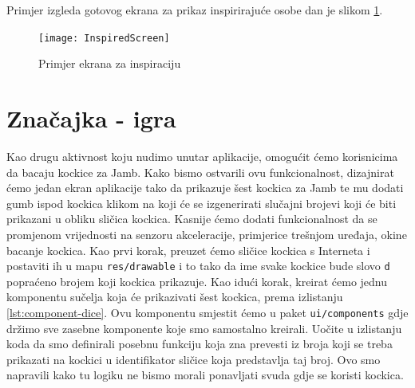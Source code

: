 \documentclass[11pt,a4paper,twoside]{article}
\begin{document}
Primjer izgleda gotovog ekrana za prikaz inspirirajuće osobe dan je slikom \ref{fig:InspiredScreen}.

\begin{figure}[!h]
	\centering
	\texttt{[image: InspiredScreen]}
	\caption{Primjer ekrana za inspiraciju}	
	\label{fig:InspiredScreen}
\end{figure}

\section{Značajka - igra}

Kao drugu aktivnost koju nudimo unutar aplikacije, omogućit ćemo korisnicima da bacaju kockice za Jamb. Kako bismo ostvarili ovu funkcionalnost, dizajnirat ćemo jedan ekran aplikacije tako da prikazuje šest kockica za Jamb te mu dodati gumb ispod kockica klikom na koji će se izgenerirati slučajni brojevi koji će biti prikazani u obliku sličica kockica. Kasnije ćemo dodati funkcionalnost da se promjenom vrijednosti na senzoru akceleracije, primjerice trešnjom uređaja, okine bacanje kockica. Kao prvi korak, preuzet ćemo sličice kockica s Interneta i postaviti ih u mapu \texttt{res/drawable} i to tako da ime svake kockice bude slovo \texttt{d} popraćeno brojem koji kockica prikazuje. Kao idući korak, kreirat ćemo jednu komponentu sučelja koja će prikazivati šest kockica, prema izlistanju \ref{lst:component-dice}. Ovu komponentu smjestit ćemo u paket \texttt{ui/components} gdje držimo sve zasebne komponente koje smo samostalno kreirali. Uočite u izlistanju koda da smo definirali posebnu funkciju koja zna prevesti iz broja koji se treba prikazati na kockici u identifikator sličice koja predstavlja taj broj. Ovo smo napravili kako tu logiku ne bismo morali ponavljati svuda gdje se koristi kockica.
\end{document}
